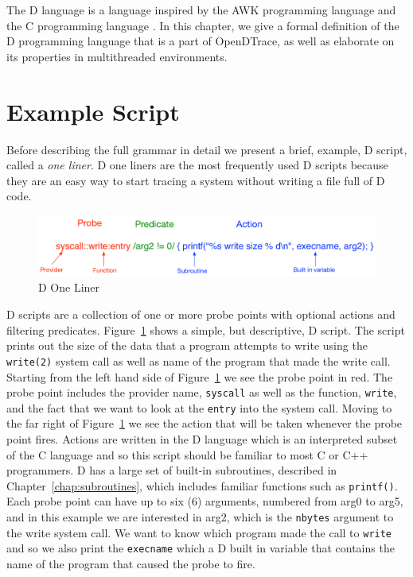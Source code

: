 The D language is a language inspired by the AWK programming language
\cite{Aho:1987:APL:29361} and the C programming language
\cite{DTrace2004}\cite{Kernighan:1988}. In this chapter, we give a
formal definition of the D programming language that is a part of
OpenDTrace, as well as elaborate on its properties in multithreaded
environments.

\section{Example Script}
\label{sec:example-script}

Before describing the full grammar in detail we present a brief,
example, D script, called a \emph{one liner}.  D one liners are the
most frequently used D scripts because they are an easy way to start
tracing a system without writing a file full of D code.  


\begin{figure}
  \centering
  \includegraphics[width=0.8\linewidth]{oneliner.pdf}
  \caption{D One Liner}
  \label{fig:d-one-liner}
\end{figure}

D scripts are a collection of one or more probe points with optional
actions and filtering predicates.  Figure~\ref{fig:d-one-liner} shows
a simple, but descriptive, D script.  The script prints out the size
of the data that a program attempts to write using the
\texttt{write(2)} system call as well as name of the program that made
the write call.  Starting from the left hand side of
Figure~\ref{fig:d-one-liner} we see the probe point in red.  The probe
point includes the provider name, \texttt{syscall} as well as the
function, \texttt{write}, and the fact that we want to look at the
\texttt{entry} into the system call.  Moving to the far right of
Figure~\ref{fig:d-one-liner} we see the action that will be taken
whenever the probe point fires.  Actions are written in the D language
which is an interpreted subset of the C language and so this script
should be familiar to most C or C++ programmers.  D has a large set of
built-in subroutines, described in Chapter~\ref{chap:subroutines},
which includes familiar functions such as \texttt{printf()}.  Each
probe point can have up to six (6) arguments, numbered from arg0 to
arg5, and in this example we are interested in arg2, which is the
\texttt{nbytes} argument to the write system call.  We want to know
which program made the call to \texttt{write} and so we also print the
\texttt{execname} which a D built in variable that contains the name
of the program that caused the probe to fire.

